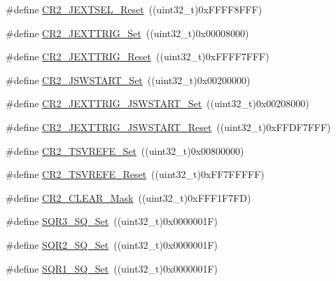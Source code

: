 \begin{DoxyCompactItemize}
\item 
\#define \mbox{\hyperlink{group___a_d_c___private___defines_gafa78c11893aa39ad2c0117414ae1704d}{C\+R2\+\_\+\+J\+E\+X\+T\+S\+E\+L\+\_\+\+Reset}}~((uint32\+\_\+t)0x\+F\+F\+F\+F8\+F\+F\+F)
\item 
\#define \mbox{\hyperlink{group___a_d_c___private___defines_ga20a54958799c567e9efaa0635aa18a99}{C\+R2\+\_\+\+J\+E\+X\+T\+T\+R\+I\+G\+\_\+\+Set}}~((uint32\+\_\+t)0x00008000)
\item 
\#define \mbox{\hyperlink{group___a_d_c___private___defines_ga94404d5a0103c5e2d7ffa45956356931}{C\+R2\+\_\+\+J\+E\+X\+T\+T\+R\+I\+G\+\_\+\+Reset}}~((uint32\+\_\+t)0x\+F\+F\+F\+F7\+F\+F\+F)
\item 
\#define \mbox{\hyperlink{group___a_d_c___private___defines_ga5292617782f3327f2e1ed0bd9461704e}{C\+R2\+\_\+\+J\+S\+W\+S\+T\+A\+R\+T\+\_\+\+Set}}~((uint32\+\_\+t)0x00200000)
\item 
\#define \mbox{\hyperlink{group___a_d_c___private___defines_gaac5989ccf10d806f2f6a70f925d6b130}{C\+R2\+\_\+\+J\+E\+X\+T\+T\+R\+I\+G\+\_\+\+J\+S\+W\+S\+T\+A\+R\+T\+\_\+\+Set}}~((uint32\+\_\+t)0x00208000)
\item 
\#define \mbox{\hyperlink{group___a_d_c___private___defines_gaaa2fb01c1649fde61115602559942ee2}{C\+R2\+\_\+\+J\+E\+X\+T\+T\+R\+I\+G\+\_\+\+J\+S\+W\+S\+T\+A\+R\+T\+\_\+\+Reset}}~((uint32\+\_\+t)0x\+F\+F\+D\+F7\+F\+F\+F)
\item 
\#define \mbox{\hyperlink{group___a_d_c___private___defines_ga7f5e0f807edebbfcef4883f3ec42b9e8}{C\+R2\+\_\+\+T\+S\+V\+R\+E\+F\+E\+\_\+\+Set}}~((uint32\+\_\+t)0x00800000)
\item 
\#define \mbox{\hyperlink{group___a_d_c___private___defines_gaa207bc0eeed8b546dc9536b02df633b5}{C\+R2\+\_\+\+T\+S\+V\+R\+E\+F\+E\+\_\+\+Reset}}~((uint32\+\_\+t)0x\+F\+F7\+F\+F\+F\+F\+F)
\item 
\#define \mbox{\hyperlink{group___a_d_c___private___defines_ga49192361afb92aee0e3f1124ef1131a0}{C\+R2\+\_\+\+C\+L\+E\+A\+R\+\_\+\+Mask}}~((uint32\+\_\+t)0x\+F\+F\+F1\+F7\+F\+D)
\item 
\#define \mbox{\hyperlink{group___a_d_c___private___defines_ga8a04f115021dc5261562b4dc04c01109}{S\+Q\+R3\+\_\+\+S\+Q\+\_\+\+Set}}~((uint32\+\_\+t)0x0000001\+F)
\item 
\#define \mbox{\hyperlink{group___a_d_c___private___defines_ga2329f779aee00e5990d6430a01de8cb0}{S\+Q\+R2\+\_\+\+S\+Q\+\_\+\+Set}}~((uint32\+\_\+t)0x0000001\+F)
\item 
\#define \mbox{\hyperlink{group___a_d_c___private___defines_ga91fb5f63b765a543dfa419ea0219351b}{S\+Q\+R1\+\_\+\+S\+Q\+\_\+\+Set}}~((uint32\+\_\+t)0x0000001\+F)

\end{DoxyCompactItemize}
